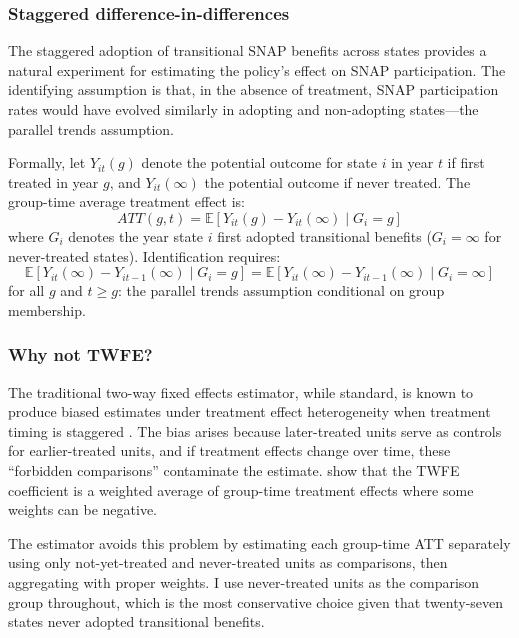 \documentclass[12pt]{article}
\newcommand{\E}{\mathbb{E}}
\begin{document}
\subsubsection*{Staggered difference-in-differences} The staggered adoption of transitional SNAP benefits across states provides a natural experiment for estimating the policy's effect on SNAP participation. The identifying assumption is that, in the absence of treatment, SNAP participation rates would have evolved similarly in adopting and non-adopting states---the parallel trends assumption.

Formally, let $Y_{it}(g)$ denote the potential outcome for state $i$ in year $t$ if first treated in year $g$, and $Y_{it}(\infty)$ the potential outcome if never treated. The group-time average treatment effect is:
\begin{equation}
ATT(g,t) = \E[Y_{it}(g) - Y_{it}(\infty) \mid G_i = g]
\end{equation}
where $G_i$ denotes the year state $i$ first adopted transitional benefits ($G_i = \infty$ for never-treated states). Identification requires:
\begin{equation}
\E[Y_{it}(\infty) - Y_{it-1}(\infty) \mid G_i = g] = \E[Y_{it}(\infty) - Y_{it-1}(\infty) \mid G_i = \infty]
\end{equation}
for all $g$ and $t \geq g$: the parallel trends assumption conditional on group membership.

\subsubsection*{Why not TWFE?} The traditional two-way fixed effects estimator, while standard, is known to produce biased estimates under treatment effect heterogeneity when treatment timing is staggered \citep{goodman2021difference, de2020two}. The bias arises because later-treated units serve as controls for earlier-treated units, and if treatment effects change over time, these ``forbidden comparisons'' contaminate the estimate. \citet{sun2021estimating} show that the TWFE coefficient is a weighted average of group-time treatment effects where some weights can be negative.

The \citet{callaway2021difference} estimator avoids this problem by estimating each group-time ATT separately using only not-yet-treated and never-treated units as comparisons, then aggregating with proper weights. I use never-treated units as the comparison group throughout, which is the most conservative choice given that twenty-seven states never adopted transitional benefits.
\end{document}
